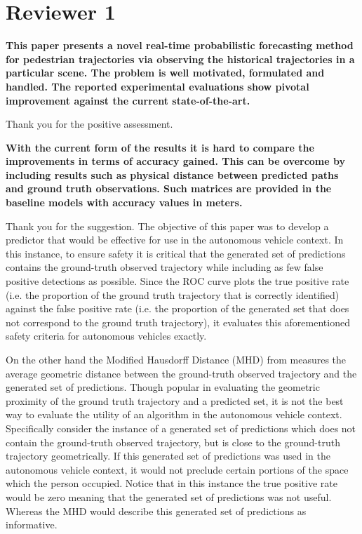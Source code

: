 \documentclass[usenames,dvipsnames]{article}
\begin{document}
\section*{Reviewer 1}
\begin{enumerate}

\begin{item}
\textbf{This paper presents a novel real-time probabilistic forecasting method
for pedestrian trajectories via observing the historical trajectories
in a particular scene. The problem is well motivated, formulated and
handled. The reported experimental evaluations show pivotal improvement
against the current state-of-the-art.} 

Thank you for the positive assessment.
\end{item}

\begin{item} \label{newmetrics}
\textbf{With the current form of the results it is hard to compare the
improvements in terms of accuracy gained. This can be overcome by
including results such as physical distance between predicted paths and
ground truth observations. Such matrices are provided in the baseline
models \cite{Kitani2012} \cite{Karasev2016} \cite{Robicquet2016} with accuracy values in meters. }

Thank you for the suggestion. 
The objective of this paper was to develop a predictor that would be effective for use in the autonomous vehicle context. 
In this instance, to ensure safety it is critical that the generated set of predictions contains the ground-truth observed trajectory while including as few false positive detections as possible.
Since the ROC curve plots the true positive rate (i.e. the proportion of the ground truth trajectory that is correctly identified) against the false positive rate (i.e. the proportion of the generated set that does not correspond to the ground truth trajectory), it evaluates this aforementioned safety criteria for autonomous vehicles exactly. 

On the other hand the Modified Hausdorff Distance (MHD) from \cite{Dubuisson1994} measures the average geometric distance between the ground-truth observed trajectory and the generated set of predictions. 
Though popular in evaluating the geometric proximity of the ground truth trajectory and a predicted set, it is not the best way to evaluate the utility of an algorithm in the autonomous vehicle context. 
Specifically consider the instance of a generated set of predictions which does not contain the ground-truth observed trajectory, but is close to the ground-truth trajectory geometrically. 
If this generated set of predictions was used in the autonomous vehicle context, it would not preclude certain portions of the space which the person occupied. 
Notice that in this instance the true positive rate would be zero meaning that the generated set of predictions was not useful.
Whereas the MHD would describe this generated set of predictions as informative.


\end{item}
\end{enumerate}
\end{document}
